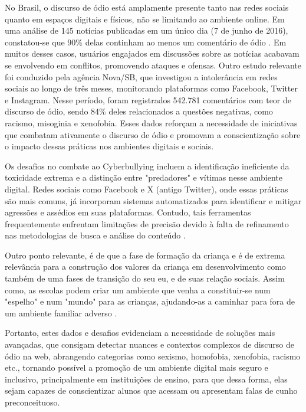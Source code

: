 No Brasil, o discurso de ódio está amplamente presente tanto nas redes sociais quanto em espaços digitais e físicos, não se limitando ao ambiente online. Em uma análise de 145 notícias publicadas em um único dia (7 de junho de 2016), constatou-se que 90\% delas continham ao menos um comentário de ódio \cite{pelle2016offensive}. Em muitos desses casos, usuários engajados em discussões sobre as notícias acabavam se envolvendo em conflitos, promovendo ataques e ofensas. Outro estudo relevante foi conduzido pela agência Nova/SB, que investigou a intolerância em redes sociais ao longo de três meses, monitorando plataformas como Facebook, Twitter e Instagram. Nesse período, foram registrados 542.781 comentários com teor de discurso de ódio, sendo 84\% deles relacionados a questões negativas, como racismo, misoginia e xenofobia. Esses dados reforçam a necessidade de iniciativas que combatam ativamente o discurso de ódio e promovam a conscientização sobre o impacto dessas práticas nos ambientes digitais e sociais.

Os desafios no combate ao Cyberbullying incluem a identificação ineficiente da toxicidade extrema e a distinção entre "predadores" e vítimas nesse ambiente digital. Redes sociais como Facebook e X (antigo Twitter), onde essas práticas são mais comuns, já incorporam sistemas automatizados para identificar e mitigar agressões e assédios em suas plataformas. Contudo, tais ferramentas frequentemente enfrentam limitações de precisão devido à falta de refinamento nas metodologias de busca e análise do conteúdo \cite{sharma2017detecting}.

Outro ponto relevante, é de que a fase de formação da criança e é de extrema relevância para a construção dos valores da criança em desenvolvimento como também de uma fases de transição do seu eu, e de suas relação sociais. Assim como, as escolas podem criar um ambiente que venha a constituir-se num "espelho" e num "mundo" para as crianças, ajudando-as a caminhar para fora de um ambiente familiar adverso \cite{szymanski2007relacao}.

Portanto, estes dados e desafios evidenciam a necessidade de soluções mais avançadas, que consigam detectar nuances e contextos complexos de discurso de ódio na web, abrangendo categorias como sexismo, homofobia, xenofobia, racismo etc., tornando possível a promoção de um ambiente digital mais seguro e inclusivo, principalmente em instituições de ensino, para que dessa forma, elas sejam capazes de conscientizar alunos que acessam ou apresentam falas de cunho preconceituoso. 

